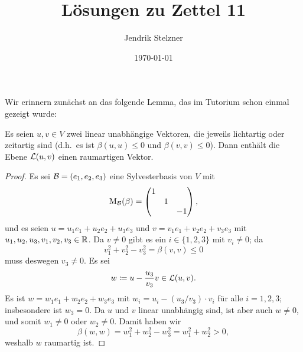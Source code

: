 \documentclass[a4paper,10pt,numbers=noenddot]{scrartcl}
\title{Lösungen zu Zettel 11}
\author{Jendrik Stelzner}
\date{\today}
\begin{document}
\maketitle


Wir erinnern zunächst an das folgende Lemma, das im Tutorium schon einmal gezeigt wurde:


\begin{lemma}\label{lem: existence of spacelike vectors}
  Es seien $u, v \in V$ zwei linear unabhängige Vektoren, die jeweils lichtartig oder zeitartig sind (d.h.\ es ist $\beta(u,u) \leq 0$ und $\beta(v,v) \leq 0$).
  Dann enthält die Ebene $\operatorname{\mathcal{L}}(u,v)$ einen raumartigen Vektor.
\end{lemma}
\begin{proof}
  Es sei $\mathcal{B} = (e_1, e_2, e_3)$ eine Sylvesterbasis von $V$ mit
  \[
    \operatorname{M}_{\mathcal{B}}(\beta)
    =
    \begin{pmatrix}
      1 &   &     \\
        & 1 &     \\
        &   & -1
    \end{pmatrix},
  \]
  und es seien $u = u_1 e_1 + u_2 e_2 + u_3 e_3$ und $v = v_1 e_1 + v_2 e_2 + v_3 e_3$ mit $u_1, u_2, u_3, v_1, v_2, v_3 \in \mathbb{R}$.
  Da $v \neq 0$ gibt es ein $i \in \{1, 2, 3\}$ mit $v_i \neq 0$; da
  \[
      v_1^2 + v_2^2 - v_3^2
    = \beta(v,v)
    \leq 0
  \]
  muss deswegen $v_3 \neq 0$.
  Es sei 
  \[
              w
    \coloneqq u - \frac{u_3}{v_3} v
    \in       \operatorname{\mathcal{L}}(u, v).
  \]
  Es ist $w = w_1 e_1 + w_2 e_2 + w_3 e_3$ mit $w_i = u_i - (u_3/v_3) \cdot v_i$ für alle $i = 1, 2, 3$; insbesondere ist $w_3 = 0$.
  Da $u$ und $v$ linear unabhängig sind, ist aber auch $w \neq 0$, und somit $w_1 \neq 0$ oder $w_2 \neq 0$.
  Damit haben wir
  \[
      \beta(w,w)
    = w_1^2 + w_2^2 - w_3^2
    = w_1^2 + w_2^2
    > 0,
  \]
  weshalb $w$ raumartig ist.
\end{proof}










\addtocounter{section}{2}










\section{}
\end{document}
